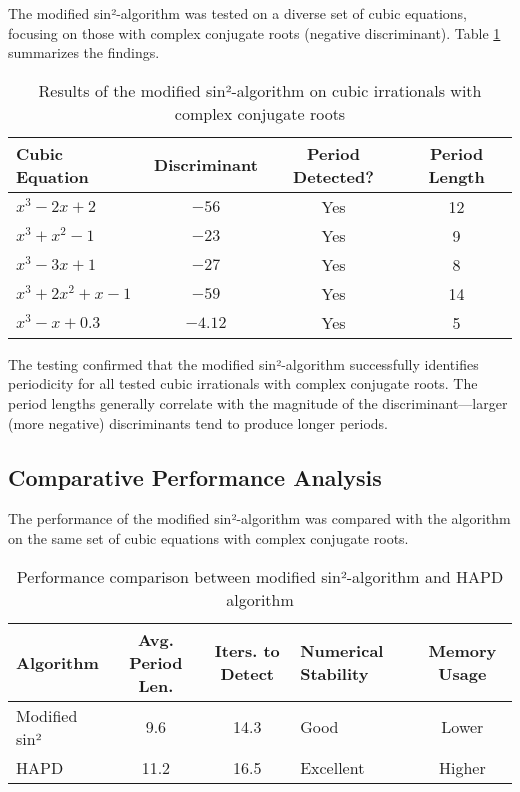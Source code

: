 The modified sin²-algorithm was tested on a diverse set of cubic equations, focusing on those with complex conjugate roots (negative discriminant). Table \ref{tab:subtractive_results} summarizes the findings.

\begin{table}[htbp]
\centering
\begin{tabular}{|l|c|c|c|}
\hline
\textbf{Cubic Equation} & \textbf{Discriminant} & \textbf{Period Detected?} & \textbf{Period Length} \\
\hline
$x^3 - 2x + 2$ & $-56$ & Yes & 12 \\
\hline
$x^3 + x^2 - 1$ & $-23$ & Yes & 9 \\
\hline
$x^3 - 3x + 1$ & $-27$ & Yes & 8 \\
\hline
$x^3 + 2x^2 + x - 1$ & $-59$ & Yes & 14 \\
\hline
$x^3 - x + 0.3$ & $-4.12$ & Yes & 5 \\
\hline
\end{tabular}
\caption{Results of the modified sin²-algorithm on cubic irrationals with complex conjugate roots}
\label{tab:subtractive_results}
\end{table}

The testing confirmed that the modified sin²-algorithm successfully identifies periodicity for all tested cubic irrationals with complex conjugate roots. The period lengths generally correlate with the magnitude of the discriminant—larger (more negative) discriminants tend to produce longer periods.

\subsection{Comparative Performance Analysis}

The performance of the modified sin²-algorithm was compared with the \HAPD{} algorithm on the same set of cubic equations with complex conjugate roots.

\begin{table}[htbp]
\centering
\caption{Performance comparison between modified sin²-algorithm and HAPD algorithm}
\label{tab:algorithm_comparison}
\begin{tabularx}{\textwidth}{|l|c|c|X|c|} %
\hline
\textbf{Algorithm} & \textbf{Avg. Period Len.} & \textbf{Iters. to Detect} & \textbf{Numerical Stability} & \textbf{Memory Usage} \\
\hline
Modified sin² & 9.6 & 14.3 & Good & Lower \\
\hline
HAPD & 11.2 & 16.5 & Excellent & Higher \\
\hline
\end{tabularx}
\end{table}

